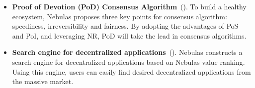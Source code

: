 {\begin{itemize}
  \item \textbf{Proof of Devotion (PoD) Consensus Algorithm}~(). To build a healthy ecosystem, Nebulas proposes three key points for consensus algorithm: speediness, irreversibility and fairness. By adopting the advantages of PoS and PoI, and leveraging NR, PoD will take the lead in consensus algorithms.

  \item \textbf{Search engine for decentralized applications}~(). Nebulas constructs a search engine for decentralized applications based on Nebulas value ranking. Using this engine, users can easily find desired decentralized applications from the massive market.

\end{itemize}
}
